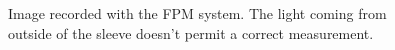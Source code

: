 \begin{figure}[!ht]
	\begin{center}
		
	\end{center}
	\caption[Image recorded with the FPM system.]{Image recorded with the FPM system. The light coming from outside of the sleeve doesn't permit a correct measurement.}
	\label{chap4:FPM}
\end{figure}
